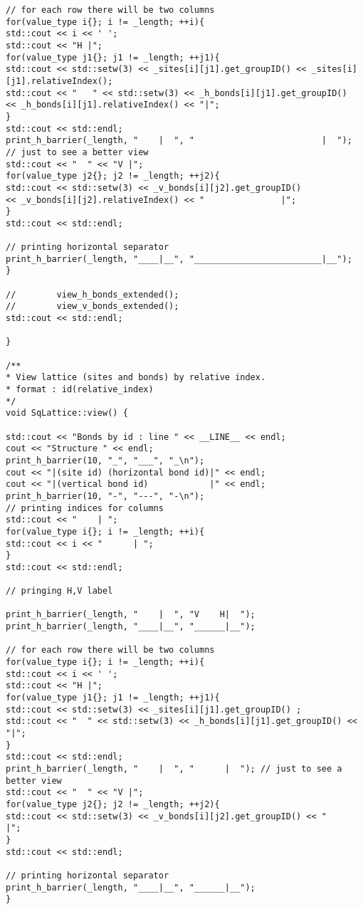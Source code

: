 \begin{lstlisting}[style=CStyle]
// for each row there will be two columns
for(value_type i{}; i != _length; ++i){
std::cout << i << ' ';
std::cout << "H |";
for(value_type j1{}; j1 != _length; ++j1){
std::cout << std::setw(3) << _sites[i][j1].get_groupID() << _sites[i][j1].relativeIndex();
std::cout << "   " << std::setw(3) << _h_bonds[i][j1].get_groupID()
<< _h_bonds[i][j1].relativeIndex() << "|";
}
std::cout << std::endl;
print_h_barrier(_length, "    |  ", "                         |  "); // just to see a better view
std::cout << "  " << "V |";
for(value_type j2{}; j2 != _length; ++j2){
std::cout << std::setw(3) << _v_bonds[i][j2].get_groupID()
<< _v_bonds[i][j2].relativeIndex() << "               |";
}
std::cout << std::endl;

// printing horizontal separator
print_h_barrier(_length, "____|__", "_________________________|__");
}

//        view_h_bonds_extended();
//        view_v_bonds_extended();
std::cout << std::endl;

}

/**
* View lattice (sites and bonds) by relative index.
* format : id(relative_index)
*/
void SqLattice::view() {

std::cout << "Bonds by id : line " << __LINE__ << endl;
cout << "Structure " << endl;
print_h_barrier(10, "_", "___", "_\n");
cout << "|(site id) (horizontal bond id)|" << endl;
cout << "|(vertical bond id)            |" << endl;
print_h_barrier(10, "-", "---", "-\n");
// printing indices for columns
std::cout << "    | ";
for(value_type i{}; i != _length; ++i){
std::cout << i << "      | ";
}
std::cout << std::endl;

// pringing H,V label

print_h_barrier(_length, "    |  ", "V    H|  ");
print_h_barrier(_length, "____|__", "______|__");

// for each row there will be two columns
for(value_type i{}; i != _length; ++i){
std::cout << i << ' ';
std::cout << "H |";
for(value_type j1{}; j1 != _length; ++j1){
std::cout << std::setw(3) << _sites[i][j1].get_groupID() ;
std::cout << "  " << std::setw(3) << _h_bonds[i][j1].get_groupID() << "|";
}
std::cout << std::endl;
print_h_barrier(_length, "    |  ", "      |  "); // just to see a better view
std::cout << "  " << "V |";
for(value_type j2{}; j2 != _length; ++j2){
std::cout << std::setw(3) << _v_bonds[i][j2].get_groupID() << "     |";
}
std::cout << std::endl;

// printing horizontal separator
print_h_barrier(_length, "____|__", "______|__");
}


\end{lstlisting}

